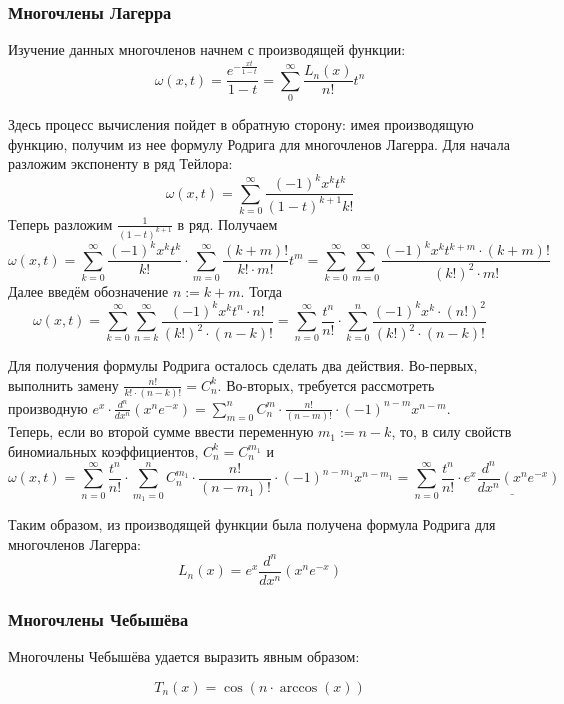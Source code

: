 \documentclass[12pt]{article}
\begin{document}
		\subsubsection{Многочлены Лагерра}
	
			Изучение данных многочленов начнем с производящей функции:
			$$ \omega(x,t) = \frac{e^{-\frac{xt}{1-t}}}{1 - t} = \sum_0^{\infty} \frac{L_n(x)}{n!} t^n$$
	
			Здесь процесс вычисления пойдет в обратную сторону: имея производящую функцию, получим из нее формулу Родрига для
			многочленов Лагерра. Для начала разложим экспоненту в ряд Тейлора:
			$$ \omega(x,t) = \sum_{k=0}^{\infty} \frac{(-1)^k x^k t^k}{(1-t)^{k+1} k!}$$
			Теперь разложим $\frac{1}{(1-t)^{k+1}}$ в ряд. Получаем
			$$ \omega(x,t) = \sum_{k=0}^{\infty} \frac{(-1)^k x^k t^k}{k!} \cdot \sum_{m=0}^{\infty} \frac{(k+m)!}{k! \cdot m!} t^m
			 = \sum_{k=0}^{\infty} \sum_{m=0}^{\infty} \frac{(-1)^k x^k t^{k+m} \cdot (k+m)!}{(k!)^2 \cdot m!} $$
			Далее введём обозначение $n := k+m$. Тогда
			$$ \omega(x,t) = \sum_{k=0}^{\infty} \sum_{n=k}^{\infty} \frac{(-1)^k x^k t^n \cdot n!}{(k!)^2 \cdot (n-k)!}
			 = \sum_{n=0}^{\infty} \frac{t^n}{n!} \cdot \sum_{k=0}^{n} \frac{(-1)^k x^k \cdot (n!)^2}{(k!)^2 \cdot (n-k)!}$$
			 
			Для получения формулы Родрига осталось сделать два действия. Во-первых, выполнить замену $\frac{n!}{k! \cdot (n-k)!} = C_n^k$.
			Во-вторых, требуется рассмотреть производную $e^x \cdot \frac{d^n}{dx^n}(x^n e^{-x}) 
			= \sum_{m=0}^n C_n^m \cdot \frac{n!}{(n-m)!} \cdot (-1)^{n-m} x^{n-m}$. \\
			Теперь, если во второй сумме ввести переменную $m_1 := n - k$, то, в силу свойств биномиальных коэффициентов, $C_n^k = C_n^{m_1}$ и
			$$\omega(x,t) = \sum_{n=0}^{\infty} \frac{t^n}{n!} \cdot \sum_{m_1=0}^{n} C_n^{m_1} \cdot \frac{n!}{(n-m_1)!}
			\cdot (-1)^{n-m_1} x^{n-m_1} = \sum_{n=0}^{\infty} \frac{t^n}{n!} \cdot \underline{e^x \frac{d^n}{dx^n}(x^n e^{-x})}$$
	
			Таким образом, из производящей функции была получена формула Родрига для многочленов Лагерра:
			$$L_n(x) = e^x \frac{d^n}{dx^n}(x^n e^{-x})$$
	
		\subsubsection{Многочлены Чебышёва}

			Многочлены Чебышёва удается выразить явным образом:

			$$T_n(x) = \cos(n \cdot \arccos(x))$$
\end{document}
